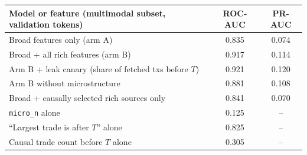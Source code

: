 \begin{tabular}{lcc}
\toprule
Model or feature (multimodal subset, validation tokens) & ROC-AUC & PR-AUC \\
\midrule
Broad features only (arm A) & 0.835 & 0.074 \\
Broad + all rich features (arm B) & 0.917 & 0.114 \\
Arm B + leak canary (share of fetched txs before $T$) & 0.921 & 0.120 \\
Arm B without microstructure & 0.881 & 0.108 \\
Broad + causally selected rich sources only & 0.841 & 0.070 \\
\midrule
\texttt{micro\_n} alone & 0.125 & -- \\
``Largest trade is after $T$'' alone & 0.825 & -- \\
Causal trade count before $T$ alone & 0.305 & -- \\
\bottomrule
\end{tabular}

